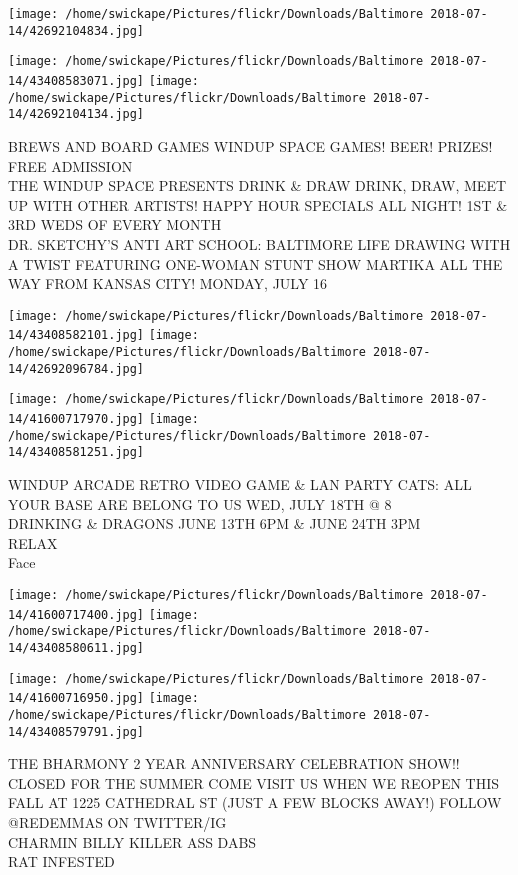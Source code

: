 \documentclass[10pt,letterpaper]{article}
\begin{document}
\texttt{[image: /home/swickape/Pictures/flickr/Downloads/Baltimore 2018-07-14/42692104834.jpg]}

\vspace{0.25in}
\texttt{[image: /home/swickape/Pictures/flickr/Downloads/Baltimore 2018-07-14/43408583071.jpg]}
\texttt{[image: /home/swickape/Pictures/flickr/Downloads/Baltimore 2018-07-14/42692104134.jpg]}

BREWS AND BOARD GAMES WINDUP SPACE GAMES!  BEER!  PRIZES!  FREE ADMISSION\\
THE WINDUP SPACE PRESENTS DRINK \& DRAW DRINK, DRAW, MEET UP WITH OTHER ARTISTS!  HAPPY HOUR SPECIALS ALL NIGHT!  1ST \& 3RD WEDS OF EVERY MONTH\\
DR. SKETCHY'S ANTI ART SCHOOL: BALTIMORE LIFE DRAWING WITH A TWIST FEATURING ONE{-}WOMAN STUNT SHOW MARTIKA ALL THE WAY FROM KANSAS CITY! MONDAY, JULY 16\\
\pagebreak

\texttt{[image: /home/swickape/Pictures/flickr/Downloads/Baltimore 2018-07-14/43408582101.jpg]}
\texttt{[image: /home/swickape/Pictures/flickr/Downloads/Baltimore 2018-07-14/42692096784.jpg]}

\texttt{[image: /home/swickape/Pictures/flickr/Downloads/Baltimore 2018-07-14/41600717970.jpg]}
\texttt{[image: /home/swickape/Pictures/flickr/Downloads/Baltimore 2018-07-14/43408581251.jpg]}

WINDUP ARCADE RETRO VIDEO GAME \& LAN PARTY CATS: ALL YOUR BASE ARE BELONG TO US WED, JULY 18TH @ 8\\
DRINKING \& DRAGONS JUNE 13TH 6PM \& JUNE 24TH 3PM\\
RELAX\\
Face\\
\pagebreak

\texttt{[image: /home/swickape/Pictures/flickr/Downloads/Baltimore 2018-07-14/41600717400.jpg]}
\texttt{[image: /home/swickape/Pictures/flickr/Downloads/Baltimore 2018-07-14/43408580611.jpg]}

\texttt{[image: /home/swickape/Pictures/flickr/Downloads/Baltimore 2018-07-14/41600716950.jpg]}
\texttt{[image: /home/swickape/Pictures/flickr/Downloads/Baltimore 2018-07-14/43408579791.jpg]}

THE BHARMONY 2 YEAR ANNIVERSARY CELEBRATION SHOW!!\\
CLOSED FOR THE SUMMER COME VISIT US WHEN WE REOPEN THIS FALL AT 1225 CATHEDRAL ST (JUST A FEW BLOCKS AWAY!) FOLLOW @REDEMMAS ON TWITTER/IG\\
CHARMIN BILLY KILLER ASS DABS\\
RAT INFESTED\\
\pagebreak
\end{document}

